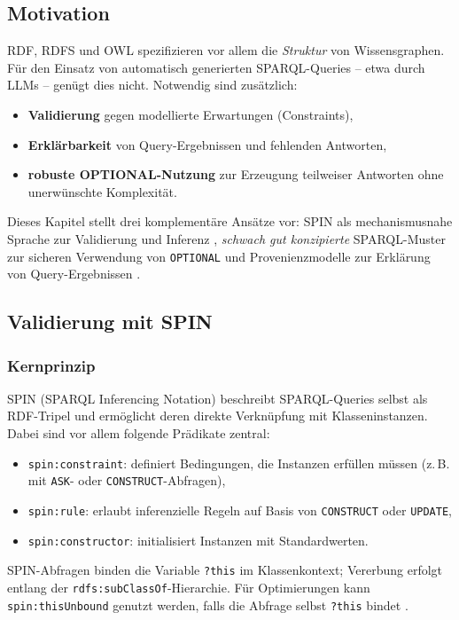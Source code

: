 \subsection{Motivation}
RDF, RDFS und OWL spezifizieren vor allem die \emph{Struktur} von Wissensgraphen. Für den Einsatz von automatisch generierten SPARQL-Queries – etwa durch LLMs – genügt dies nicht. Notwendig sind zusätzlich:
\begin{itemize}
\item \textbf{Validierung} gegen modellierte Erwartungen (Constraints),
\item \textbf{Erklärbarkeit} von Query-Ergebnissen und fehlenden Antworten,
\item \textbf{robuste OPTIONAL-Nutzung} zur Erzeugung teilweiser Antworten ohne unerwünschte Komplexität.
\end{itemize}
Dieses Kapitel stellt drei komplementäre Ansätze vor: SPIN als mechanismusnahe Sprache zur Validierung und Inferenz \cite{spin-w3c}, \emph{schwach gut konzipierte} SPARQL-Muster zur sicheren Verwendung von \texttt{OPTIONAL} \cite{kaminski-kostylev-beyond-well-designed} und Provenienzmodelle zur Erklärung von Query-Ergebnissen \cite{green-provenance-semirings,herschel-why-why-not,herschel-survey}.

\subsection{Validierung mit SPIN}

\subsubsection{Kernprinzip}
SPIN (SPARQL Inferencing Notation) beschreibt SPARQL-Queries selbst als RDF-Tripel und ermöglicht deren direkte Verknüpfung mit Klasseninstanzen. Dabei sind vor allem folgende Prädikate zentral:
\begin{itemize}
\item \texttt{spin:constraint}: definiert Bedingungen, die Instanzen erfüllen müssen (z.\,B. mit \texttt{ASK}- oder \texttt{CONSTRUCT}-Abfragen),
\item \texttt{spin:rule}: erlaubt inferenzielle Regeln auf Basis von \texttt{CONSTRUCT} oder \texttt{UPDATE},
\item \texttt{spin:constructor}: initialisiert Instanzen mit Standardwerten.
\end{itemize}
SPIN-Abfragen binden die Variable \texttt{?this} im Klassenkontext; Vererbung erfolgt entlang der \texttt{rdfs:subClassOf}-Hierarchie. Für Optimierungen kann \texttt{spin:thisUnbound} genutzt werden, falls die Abfrage selbst \texttt{?this} bindet \cite{spin-w3c}.

